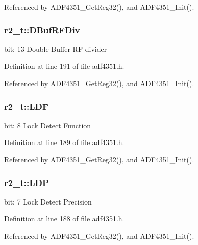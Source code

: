 Referenced by A\+D\+F4351\+\_\+\+Get\+Reg32(), and A\+D\+F4351\+\_\+\+Init().

\subsubsection[{\texorpdfstring{D\+Buf\+R\+F\+Div}{DBufRFDiv}}]{ r2\+\_\+t\+::\+D\+Buf\+R\+F\+Div}\hypertarget{structr2__t_a14726d1cf923d8e12279cd3038fa0540}{}\label{structr2__t_a14726d1cf923d8e12279cd3038fa0540}
bit\+: 13 Double Buffer RF divider 

Definition at line 191 of file adf4351.\+h.



Referenced by A\+D\+F4351\+\_\+\+Get\+Reg32(), and A\+D\+F4351\+\_\+\+Init().

\subsubsection[{\texorpdfstring{L\+DF}{LDF}}]{ r2\+\_\+t\+::\+L\+DF}\hypertarget{structr2__t_a42f019ff5be1600c098175eb64ab55da}{}\label{structr2__t_a42f019ff5be1600c098175eb64ab55da}
bit\+: 8 Lock Detect Function 

Definition at line 189 of file adf4351.\+h.



Referenced by A\+D\+F4351\+\_\+\+Get\+Reg32(), and A\+D\+F4351\+\_\+\+Init().

\subsubsection[{\texorpdfstring{L\+DP}{LDP}}]{ r2\+\_\+t\+::\+L\+DP}\hypertarget{structr2__t_a406cd49f63cb56882de02e7fe2ace6bf}{}\label{structr2__t_a406cd49f63cb56882de02e7fe2ace6bf}
bit\+: 7 Lock Detect Precision 

Definition at line 188 of file adf4351.\+h.



Referenced by A\+D\+F4351\+\_\+\+Get\+Reg32(), and A\+D\+F4351\+\_\+\+Init().

